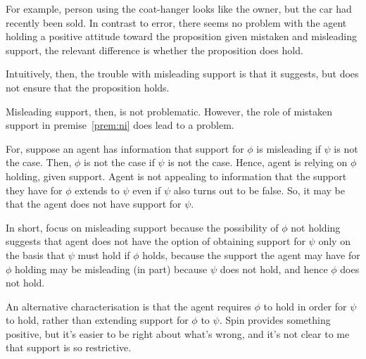 \begin{note}[Inertia]
  For example, person using the coat-hanger looks like the owner, but the car had recently been sold.
  In contrast to error, there seems no problem with the agent holding a positive attitude toward the proposition given mistaken and misleading support, the relevant difference is whether the proposition does hold.

  Intuitively, then, the trouble with misleading support is that it suggests, but does not ensure that the proposition holds.

  Misleading support, then, is not problematic.
  However, the role of mistaken support in premise~\ref{prem:ni} does lead to a problem.

  For, suppose an agent has information that support for \(\phi\) is misleading if \(\psi\) is not the case.
  Then, \(\phi\) is not the case if \(\psi\) is not the case.
  Hence, agent is relying on \(\phi\) holding, given support.
  Agent is not appealing to information that the support they have for \(\phi\) extends to \(\psi\) even if \(\psi\) also turns out to be false.
  So, it may be that the agent does not have support for \(\psi\).

  In short, focus on misleading support because the possibility of \(\phi\) not holding suggests that agent does not have the option of obtaining support for \(\psi\) only on the basis that \(\psi\) must hold if \(\phi\) holds, because the support the agent may have for \(\phi\) holding may be misleading (in part) because \(\psi\) does not hold, and hence \(\phi\) does not hold.

  An alternative characterisation is that the agent requires \(\phi\) to hold in order for \(\psi\) to hold, rather than extending support for \(\phi\) to \(\psi\).
  Spin provides something positive, but it's easier to be right about what's wrong, and it's not clear to me that support is so restrictive.
\end{note}


